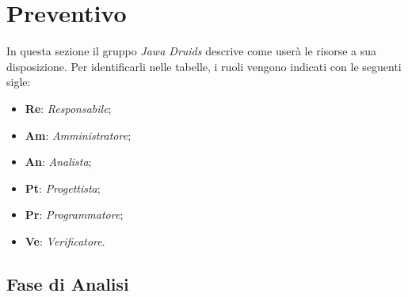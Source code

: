 \chapter{Preventivo}\label{Preventivo}

In questa sezione il gruppo \textit{Jawa Druids} descrive come userà le risorse a sua disposizione. Per identificarli nelle tabelle, i ruoli vengono indicati con le seguenti sigle:
\begin{itemize}
	\item \textbf{Re}: \textit{Responsabile};
	\item \textbf{Am}: \textit{Amministratore};
	\item \textbf{An}: \textit{Analista};
	\item \textbf{Pt}: \textit{Progettista};
	\item \textbf{Pr}: \textit{Programmatore};
	\item \textbf{Ve}: \textit{Verificatore}.
\end{itemize}
\clearpage
\section{Fase di Analisi}\label{PreventivoFaseDiAnalisi}

